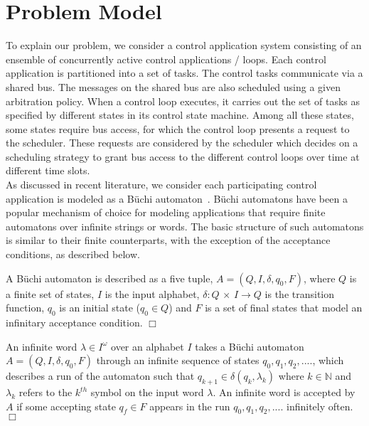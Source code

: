 \section{Problem Model} \label{sec3}
\noindent
To explain our problem, we consider a control application system consisting of an ensemble of concurrently active control applications / loops. Each control application is partitioned into a set of
tasks. The control tasks communicate via a shared bus. The messages on the shared bus are also scheduled using a given arbitration policy. When a control loop executes, it carries out the set of tasks as specified by different states in its control state machine. Among all these states, some
states require bus access, for which the control loop presents a request to the scheduler. These requests are considered by the scheduler which decides on a scheduling strategy to grant bus access to the different control loops over time at different time slots. \\

\noindent
As discussed in recent literature, we consider each participating control application is modeled as a B\"{u}chi automaton~\cite{leeuwen90/Thomas90}. B\"{u}chi automatons have been a popular mechanism of choice for modeling applications that require finite automatons over infinite strings or words. The basic structure of such automatons is similar to their finite counterparts, with the exception of the acceptance conditions, as described below.
\begin{definition}
A B\"{u}chi automaton is described as a five tuple, 
$A = (Q,I,\delta,q_0,F)$, where $Q$ is a finite set of states, $I$ is the input alphabet, $\delta : Q$ $\times$ $I \rightarrow Q $ is the transition function, $q_0$ 
is an initial state ($q_0 \in Q$) and $F$ is a set of final states that model an infinitary acceptance condition. $\Box$ 
\end{definition}

\begin{definition}
An infinite word $\lambda \in I ^ \omega$ over an alphabet $I$ takes a B\"{u}chi automaton $A = (Q,I,\delta,q_0,F)$ through an infinite sequence of states $ q_0, q_1, q_2, ....$, which describes a run of
the automaton such that $ q_{k+1} \in \delta(q_k, \lambda_k)$ where $k \in \mathbb{N}$ and $\lambda_k$ refers to the $k^{th}$ symbol on the input word $\lambda$. An infinite word is accepted by $A$ if some 
accepting state $q_f \in F $ appears in the run $ q_0, q_1, q_2, ....$ 
infinitely often. $\Box$ \\
\end{definition}

